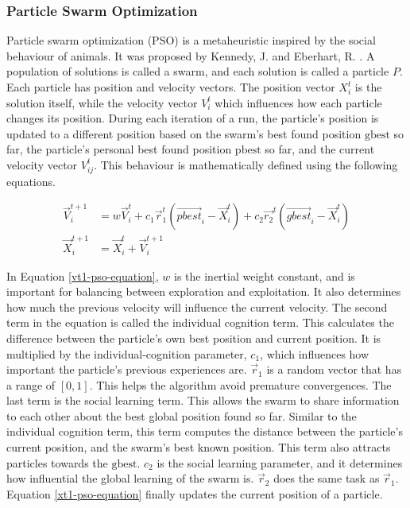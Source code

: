\subsubsection{Particle Swarm Optimization}
Particle swarm optimization (PSO) is a metaheuristic inspired by the social behaviour of animals. It was proposed by Kennedy, J. and Eberhart, R. \cite{Kennedy1995}. A population of solutions is called a swarm, and each solution is called a particle $P$. Each particle has position and velocity vectors. The position vector $X_{i}^{t}$ is the solution itself, while the velocity vector $V_{i}^{t}$ which influences how each particle changes its position. During each iteration of a run, the particle's position is updated to a different position based on the swarm's best found position $\text{gbest}$ so far, the particle's personal best found position $\text{pbest}$ so far, and the current velocity vector $V_{ij}^{t}$. This behaviour is mathematically defined using the following equations.

\begin{align}
	\vec{V}_{i}^{t+1} &= w\vec{V}_{i}^{t} + c_{1}\vec{r}_{1}^{t} \left( \vec{pbest}_{i} - \vec{X}_{i}^{t} \right) + c_{2}\vec{r_{2}}^{t} \left( \vec{gbest}_{i} - \vec{X}_{i}^{t} \right) \label{vt1-pso-equation} \\
	\vec{X}_{i}^{t+1} &= \vec{X}_{i}^{t} + \vec{V}_{i}^{t+1} \label{xt1-pso-equation}
\end{align}

In Equation \ref{vt1-pso-equation}, $w$ is the inertial weight constant, and is important for balancing between exploration and exploitation. It also determines how much the previous velocity will influence the current velocity. The second term in the equation is called the individual cognition term. This calculates the difference between the particle's own best position and current position. It is multiplied by the individual-cognition parameter, $c_{1}$, which influences how important the particle's previous experiences are. $\vec{r}_{1}$ is a random vector that has a range of $[0, 1]$. This helps the algorithm avoid premature convergences. The last term is the social learning term. This allows the swarm to share information to each other about the best global position found so far. Similar to the individual cognition term, this term computes the distance between the particle's current position, and the swarm's best known position. This term also attracts particles towards the $\text{gbest}$. $c_{2}$ is the social learning parameter, and it determines how influential the global learning of the swarm is. $\vec{r}_{2}$ does the same task as $\vec{r}_{1}$. Equation \ref{xt1-pso-equation} finally updates the current position of a particle.

